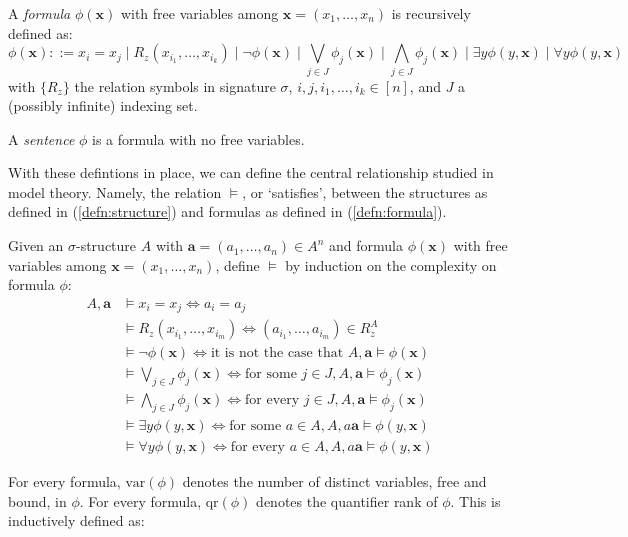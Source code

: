 \begin{defn}
A \textit{formula} $\phi(\mathbf{x})$ with free variables among $\mathbf{x} = (x_{1},\dots,x_{n})$ is recursively defined as: 
$$ \phi(\mathbf{x}) ::= x_{i} = x_{j} \mid R_{z}(x_{i_{1}},\dots,x_{i_{k}}) \mid \neg \phi(\mathbf{x}) \mid \bigvee_{j \in J} \phi_{j}(\mathbf{x}) \mid \bigwedge_{j \in J} \phi_{j}(\mathbf{x}) \mid \exists y \phi(y,\mathbf{x}) \mid \forall y \phi(y,\mathbf{x})$$
with $\{R_{z}\}$ the relation symbols in signature $\sigma$, $i,j,i_{1},\dots,i_{k} \in [n]$, and $J$ a (possibly infinite) indexing set.  
\label{defn:formula}
\end{defn}
\begin{defn}
A \textit{sentence} $\phi$ is a formula with no free variables.
\end{defn}
With these defintions in place, we can define the central relationship studied in model theory. Namely, the relation $\vDash$, or `satisfies', between the structures as defined in (\ref{defn:structure}) and formulas as defined in (\ref{defn:formula}).
\begin{defn}
Given an $\sigma$-structure $A$ with $\mathbf{a} = (a_{1},\dots,a_{n}) \in A^{n}$ and formula $\phi(\mathbf{x})$ with free variables among $\mathbf{x} = (x_{1},\dots,x_{n})$, define $\vDash$ by induction on the complexity on formula $\phi$:
\begin{align*}
A,\mathbf{a} &\vDash x_{i} = x_{j} \Leftrightarrow a_{i} = a_{j} \\
 &\vDash R_{z}(x_{i_{1}},\dots,x_{i_{m}}) \Leftrightarrow (a_{i_{1}},\dots,a_{i_{m}}) \in R_{z}^{A} \\
 &\vDash \neg \phi(\mathbf{x}) \Leftrightarrow \text{it is not the case that } A,\mathbf{a} \vDash \phi(\mathbf{x}) \\
 &\vDash \bigvee_{j \in J} \phi_{j}(\mathbf{x}) \Leftrightarrow \text{for some } j \in J,  A,\mathbf{a} \vDash \phi_{j}(\mathbf{x}) \\
 &\vDash \bigwedge_{j \in J} \phi_{j}(\mathbf{x}) \Leftrightarrow \text{for every } j \in J,  A,\mathbf{a} \vDash \phi_{j}(\mathbf{x}) \\
 &\vDash \exists y \phi(y,\mathbf{x}) \Leftrightarrow \text{for some } a \in A,  A,a\mathbf{a} \vDash \phi(y,\mathbf{x}) \\
 &\vDash \forall y \phi(y,\mathbf{x}) \Leftrightarrow \text{for every } a \in A,  A,a\mathbf{a} \vDash \phi(y,\mathbf{x}) 
\end{align*}
\end{defn}
For every formula, $\text{var}(\phi)$ denotes the number of distinct variables, free and bound, in $\phi$. For every formula, $\text{qr}(\phi)$ denotes the quantifier rank of $\phi$. This is inductively defined as:
